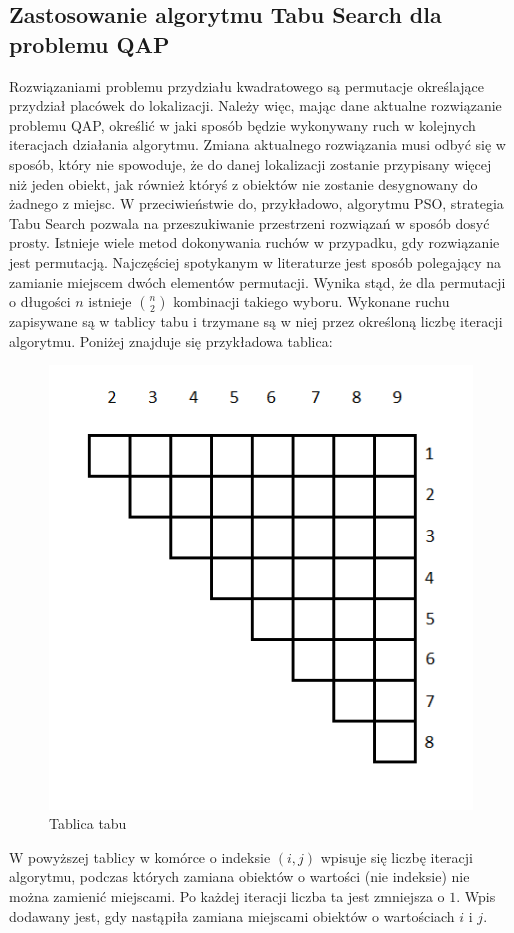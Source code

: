 \subsection{Zastosowanie algorytmu Tabu Search dla problemu QAP}
Rozwiązaniami problemu przydziału kwadratowego są permutacje określające przydział placówek do lokalizacji. Należy więc, mając dane aktualne rozwiązanie problemu QAP, określić w jaki sposób będzie wykonywany ruch w kolejnych iteracjach działania algorytmu. Zmiana aktualnego rozwiązania musi odbyć się w sposób, który nie spowoduje, że do danej lokalizacji zostanie przypisany więcej niż jeden obiekt, jak również któryś z obiektów nie zostanie desygnowany do żadnego z miejsc. W przeciwieństwie do, przykładowo, algorytmu PSO, strategia Tabu Search pozwala na przeszukiwanie przestrzeni rozwiązań w sposób dosyć prosty. Istnieje wiele metod dokonywania ruchów w przypadku, gdy rozwiązanie jest permutacją. Najczęściej spotykanym w literaturze jest sposób polegający na zamianie miejscem dwóch elementów permutacji. Wynika stąd, że dla permutacji o długości $n$ istnieje $n\choose 2$ kombinacji takiego wyboru. Wykonane ruchu zapisywane są w tablicy tabu i trzymane są w niej przez określoną liczbę iteracji algorytmu. Poniżej znajduje się przykładowa tablica:
\newpage
\begin{figure}[h]
\begin{center}
\includegraphics[scale=0.8]{tabu}
\end{center}
\caption{Tablica tabu}
\end{figure}
W powyższej tablicy w komórce o indeksie $(i,j)$ wpisuje się liczbę iteracji algorytmu, podczas których zamiana obiektów o wartości (nie indeksie) nie można zamienić miejscami. Po każdej iteracji liczba ta jest zmniejsza o $1$. Wpis dodawany jest, gdy nastąpiła zamiana miejscami obiektów o wartościach $i$ i $j$.

